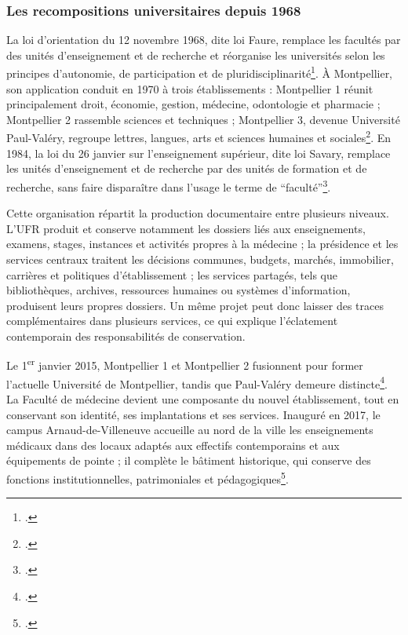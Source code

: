 \subsubsection{Les recompositions universitaires depuis 1968}

La loi d'orientation du 12 novembre 1968, dite loi Faure, remplace les facultés par des unités d'enseignement et de recherche et réorganise les universités selon les principes d'autonomie, de participation et de pluridisciplinarité\footcite{LoiFaure1968}. À Montpellier, son application conduit en 1970 à trois établissements : Montpellier 1 réunit principalement droit, économie, gestion, médecine, odontologie et pharmacie ; Montpellier 2 rassemble sciences et techniques ; Montpellier 3, devenue Université Paul-Valéry, regroupe lettres, langues, arts et sciences humaines et sociales\footcite{CNE2004Montpellier}. En 1984, la loi du 26 janvier sur l'enseignement supérieur, dite loi Savary, remplace les unités d'enseignement et de recherche par des unités de formation et de recherche, sans faire disparaître dans l'usage le terme de \enquote{faculté}\footcite[art.~25 et 32]{LoiSavary1984}.

Cette organisation répartit la production documentaire entre plusieurs niveaux. L'UFR produit et conserve notamment les dossiers liés aux enseignements, examens, stages, instances et activités propres à la médecine ; la présidence et les services centraux traitent les décisions communes, budgets, marchés, immobilier, carrières et politiques d'établissement ; les services partagés, tels que bibliothèques, archives, ressources humaines ou systèmes d'information, produisent leurs propres dossiers. Un même projet peut donc laisser des traces complémentaires dans plusieurs services, ce qui explique l'éclatement contemporain des responsabilités de conservation.

Le 1\textsuperscript{er} janvier 2015, Montpellier 1 et Montpellier 2 fusionnent pour former l'actuelle Université de Montpellier, tandis que Paul-Valéry demeure distincte\footcite{DecretUniversiteMontpellier2014}. La Faculté de médecine devient une composante du nouvel établissement, tout en conservant son identité, ses implantations et ses services. Inauguré en 2017, le campus Arnaud-de-Villeneuve accueille au nord de la ville les enseignements médicaux dans des locaux adaptés aux effectifs contemporains et aux équipements de pointe ; il complète le bâtiment historique, qui conserve des fonctions institutionnelles, patrimoniales et pédagogiques\footcite{FaculteMedecineCampusADV2017}.

